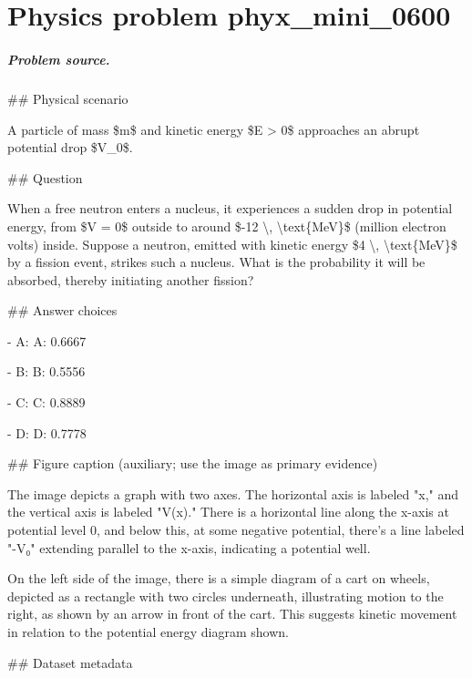 
\chapter{Physics problem phyx\_mini\_0600}
\label{ch:PhyXMiniProblems_problem_phyx_mini_0600}

\paragraph{Problem source.}
\#\# Physical scenario

A particle of mass \$m\$ and kinetic energy \$E > 0\$ approaches an abrupt potential drop \$V\_0\$.

\#\# Question

When a free neutron enters a nucleus, it experiences a sudden drop in potential energy, from \$V = 0\$ outside to around \$-12 \textbackslash{}, \textbackslash{}text\{MeV\}\$ (million electron volts) inside. Suppose a neutron, emitted with kinetic energy \$4 \textbackslash{}, \textbackslash{}text\{MeV\}\$ by a fission event, strikes such a nucleus. What is the probability it will be absorbed, thereby initiating another fission?

\#\# Answer choices

- A: A: 0.6667

- B: B: 0.5556

- C: C: 0.8889

- D: D: 0.7778

\#\# Figure caption (auxiliary; use the image as primary evidence)

The image depicts a graph with two axes. The horizontal axis is labeled "x," and the vertical axis is labeled "V(x)." There is a horizontal line along the x-axis at potential level 0, and below this, at some negative potential, there's a line labeled "-V₀" extending parallel to the x-axis, indicating a potential well.

On the left side of the image, there is a simple diagram of a cart on wheels, depicted as a rectangle with two circles underneath, illustrating motion to the right, as shown by an arrow in front of the cart. This suggests kinetic movement in relation to the potential energy diagram shown.

\#\# Dataset metadata

